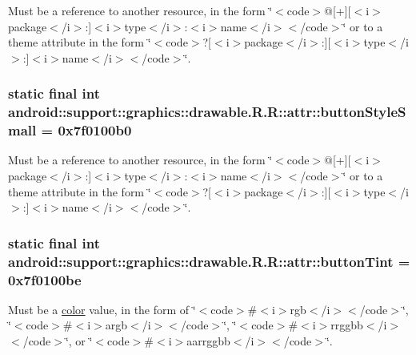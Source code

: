Must be a reference to another resource, in the form \char`\"{}$<$code$>$@\mbox{[}+\mbox{]}\mbox{[}$<$i$>$package$<$/i$>$:\mbox{]}$<$i$>$type$<$/i$>$:$<$i$>$name$<$/i$>$$<$/code$>$\char`\"{} or to a theme attribute in the form \char`\"{}$<$code$>$?\mbox{[}$<$i$>$package$<$/i$>$:\mbox{]}\mbox{[}$<$i$>$type$<$/i$>$:\mbox{]}$<$i$>$name$<$/i$>$$<$/code$>$\char`\"{}. \hypertarget{classandroid_1_1support_1_1graphics_1_1drawable_1_1_r_1_1attr_afff50c3310c835a809ab8d74569d32e}{
\subsubsection[{buttonStyleSmall}]{\setlength{\rightskip}{0pt plus 5cm}static final int android::support::graphics::drawable.R.R::attr::buttonStyleSmall = 0x7f0100b0}}
\label{classandroid_1_1support_1_1graphics_1_1drawable_1_1_r_1_1attr_afff50c3310c835a809ab8d74569d32e}


Must be a reference to another resource, in the form \char`\"{}$<$code$>$@\mbox{[}+\mbox{]}\mbox{[}$<$i$>$package$<$/i$>$:\mbox{]}$<$i$>$type$<$/i$>$:$<$i$>$name$<$/i$>$$<$/code$>$\char`\"{} or to a theme attribute in the form \char`\"{}$<$code$>$?\mbox{[}$<$i$>$package$<$/i$>$:\mbox{]}\mbox{[}$<$i$>$type$<$/i$>$:\mbox{]}$<$i$>$name$<$/i$>$$<$/code$>$\char`\"{}. \hypertarget{classandroid_1_1support_1_1graphics_1_1drawable_1_1_r_1_1attr_ef0f57c4c59173040d0780da73d1d7b3}{
\subsubsection[{buttonTint}]{\setlength{\rightskip}{0pt plus 5cm}static final int android::support::graphics::drawable.R.R::attr::buttonTint = 0x7f0100be}}
\label{classandroid_1_1support_1_1graphics_1_1drawable_1_1_r_1_1attr_ef0f57c4c59173040d0780da73d1d7b3}


Must be a \hyperlink{classandroid_1_1support_1_1graphics_1_1drawable_1_1_r_1_1color}{color} value, in the form of \char`\"{}$<$code$>$\#$<$i$>$rgb$<$/i$>$$<$/code$>$\char`\"{}, \char`\"{}$<$code$>$\#$<$i$>$argb$<$/i$>$$<$/code$>$\char`\"{}, \char`\"{}$<$code$>$\#$<$i$>$rrggbb$<$/i$>$$<$/code$>$\char`\"{}, or \char`\"{}$<$code$>$\#$<$i$>$aarrggbb$<$/i$>$$<$/code$>$\char`\"{}. 


